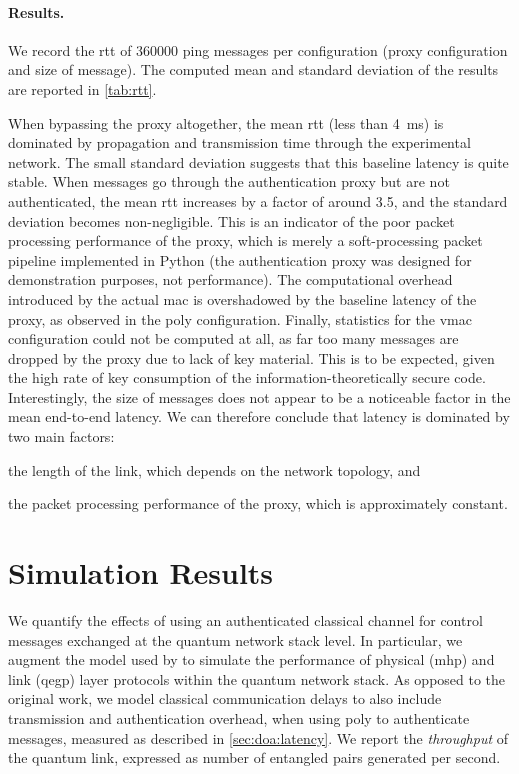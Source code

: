 \paragraph*{Results.}

We record the \acrlong{rtt} of \num{360000} ping messages per configuration (proxy configuration and
size of message). The computed mean and standard deviation of the results are reported in
\cref{tab:rtt}.

When bypassing the proxy altogether, the mean \acrshort{rtt} (less than \qty{4}{\ms}) is dominated
by propagation and transmission time through the experimental network. The small standard deviation
suggests that this baseline latency is quite stable. When messages go through the authentication
proxy but are not authenticated, the mean \acrshort{rtt} increases by a factor of around \num{3.5},
and the standard deviation becomes non-negligible. This is an indicator of the poor packet
processing performance of the proxy, which is merely a soft-processing packet pipeline implemented
in Python (the authentication proxy was designed for demonstration purposes, not performance). The
computational overhead introduced by the actual \acrshort{mac} is overshadowed by the baseline
latency of the proxy, as observed in the \acrshort{poly} configuration. Finally, statistics for the
\acrshort{vmac} configuration could not be computed at all, as far too many messages are dropped by
the proxy due to lack of key material. This is to be expected, given the high rate of key
consumption of the information-theoretically secure code. Interestingly, the size of messages does
not appear to be a noticeable factor in the mean end-to-end latency. We can therefore conclude that
latency is dominated by two main factors:
%
\begin{inlinelist}
    \item the length of the link, which depends on the network topology, and
    \item the packet processing performance of the proxy, which is approximately constant.
\end{inlinelist}

\section{Simulation Results}
\label{sec:doa:results}

We quantify the effects of using an authenticated classical channel for control messages exchanged
at the quantum network stack level. In particular, we augment the model used by
\textcite{dahlberg_2019_egp} to simulate the performance of physical (\acrshort{mhp}) and link
(\acrshort{qegp}) layer protocols within the quantum network stack. As opposed to the original work,
we model classical communication delays to also include transmission and authentication overhead,
when using \acrshort{poly} to authenticate messages, measured as described in
\cref{sec:doa:latency}. We report the \emph{throughput} of the quantum link, expressed as number of
entangled pairs generated per second.

